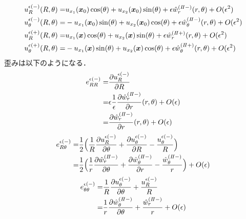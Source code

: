\begin{align}
	u_{R}^{\epsilon(-)}(R,\theta)=&u_{x_{1}}(\bm{x}_{0})\cos(\theta)+u_{x_{2}}(\bm{x}_{0})\sin(\theta)
	+\epsilon\hat{w}_{r}^{(I\hspace{-.15em}I-)}(r,\theta)+O(\epsilon^2)
	\nonumber
	\\
	u_{\theta}^{\epsilon(-)}(R,\theta)=&-u_{x_{1}}(\bm{x}_{0})\sin(\theta)+u_{x_{2}}(\bm{x}_{0})\cos(\theta)
	+\epsilon\hat{w}_{\theta}^{(I\hspace{-.15em}I-)}(r,\theta)+O(\epsilon^2)
	\nonumber
	\\
	u_{R}^{\epsilon(+)}(R,\theta)=&u_{x_{1}}(\bm{x})\cos(\theta)+u_{x_{2}}(\bm{x})\sin(\theta)
	+\epsilon\hat{w}_{r}^{(I\hspace{-.15em}I+)}(r,\theta)+O(\epsilon^2)
	\nonumber
	\\
	u_{\theta}^{\epsilon(+)}(R,\theta)=&-u_{x_{1}}(\bm{x})\sin(\theta)+u_{x_{2}}(\bm{x})\cos(\theta)
	+\epsilon\hat{w}_{\theta}^{(I\hspace{-.15em}I+)}(r,\theta)+O(\epsilon^2)
	\label{eq:SDForTD}
\end{align}
歪みは以下のようになる．
\begin{align}
	e_{RR}^{\epsilon(-)}
		=&\frac{\partial u_{R}^{\epsilon(-)}}{\partial R}
		\nonumber
		\\
		=&\epsilon\frac{1}{\epsilon}\frac{\partial\hat{w}_{r}^{(I\hspace{-.15em}I-)}}{\partial r}(r,\theta)+O(\epsilon)
		\nonumber
		\\
		=&\frac{\partial\hat{w}_{r}^{(I\hspace{-.15em}I-)}}{\partial r}(r,\theta)+O(\epsilon)
		\label{eq:eRRInEps}
\end{align}
\begin{align}
	e_{R\theta}^{\epsilon(-)}
		=&\frac{1}{2}\Bigl( \frac{1}{R}\frac{\partial u_{R}^{\epsilon(-)}}{\partial \theta}
			+\frac{\partial u_{\theta}^{\epsilon(-)}}{\partial R}-\frac{u_{\theta}^{\epsilon(-)}}{R}\Bigr)
		\nonumber
		\\
		=&\frac{1}{2}\Bigl( \frac{1}{r}\frac{\partial \hat{w}_{r}^{(I\hspace{-.15em}I-)}}{\partial \theta}
			+\frac{\partial \hat{w}_{\theta}^{(I\hspace{-.15em}I-)}}{\partial r}
			-\frac{\hat{w}_{\theta}^{(I\hspace{-.15em}I-)}}{r}\Bigr)+O(\epsilon)
\end{align}
\begin{align}
	e_{\theta\theta}^{\epsilon(-)}
		=&\frac{1}{R}\frac{\partial u_{\theta}^{\epsilon(-)}}{\partial \theta}
			+\frac{u_{R}^{\epsilon(-)}}{R}
		\nonumber
		\\
		=&\frac{1}{r}\frac{\partial \hat{w}_{\theta}^{(I\hspace{-.15em}I-)}}{\partial \theta}
			+\frac{\hat{w}_{r}^{(I\hspace{-.15em}I-)}}{r}+O(\epsilon)
\end{align}
